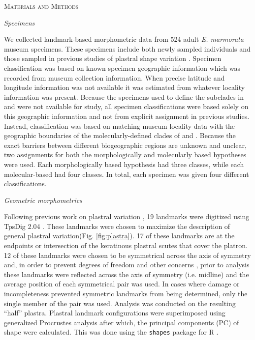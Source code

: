 \documentclass[12pt,letterpaper]{article}\usepackage{graphicx, color}
\renewcommand{\section}[1]{%
\bigskip
\begin{center}
\begin{Large}
\normalfont\scshape #1
\medskip
\end{Large}
\end{center}}
\renewcommand{\subsection}[1]{%
\bigskip
\begin{center}
\begin{large}
\normalfont\itshape #1
\end{large}
\end{center}}
\begin{document}
\section{Materials and Methods}
\subsection{Specimens}
We collected landmark-based morphometric data from 524 adult \textit{E. marmorata} museum specimens. These specimens include both newly sampled individuals and those sampled in previous studies of plastral shape variation \citep{Angielczyk2007,Angielczyk2011,Angielczyk2013a}. 
Specimen classification was based on known specimen geographic information which was recorded from museum collection information. When precise latitude and longitude information was not available it was estimated from whatever locality information was present. Because the specimens used to define the subclades in \citet{Spinks2005} and \citet{Spinks2010} were not available for study, all specimen classifications were based solely on this geographic information and not from explicit assignment in previous studies. Instead, classification was based on matching museum locality data with the geographic boundaries of the molecularly-defined clades of \citet{Spinks2005} and \citet{Spinks2010}. Because the exact barriers between different biogeographic regions are unknown and unclear, two assignments for both the morphologically and molecularly based hypotheses were used. Each morphologically based hypothesis had three classes, while each molecular-based had four classes. In total, each specimen was given four different classifications. 

\subsection{Geometric morphometrics}
Following previous work on plastral variation \citep{Angielczyk2007,Angielczyk2011,Angielczyk2013a}, 19 landmarks were digitized using TpsDig 2.04 \citep{Rohlf2005}. These landmarks were chosen to maximize the description of general plastral variation(Fig. \ref{fig:plastra}). 17 of these landmarks are at the endpoints or intersection of the keratinous plastral scutes that cover the platron. 12 of these landmarks were chosen to be symmetrical across the axis of symmetry and, in order to prevent degrees of freedom and other concerns \citep{Klingenberg2002}, prior to analysis these landmarks were reflected across the axis of symmetry (i.e. midline) and the average position of each symmetrical pair was used. In cases where damage or incompleteness prevented symmetric landmarks from being determined, only the single member of the pair was used. Analysis was conducted on the resulting ``half'' plastra.
Plastral landmark configurations were superimposed using generalized Procrustes analysis \citep{Dryden1998a} after which, the principal components (PC) of shape were calculated. This was done using the \texttt{shapes} package for R \citep{2013,Dryden2013}.
\end{document}
